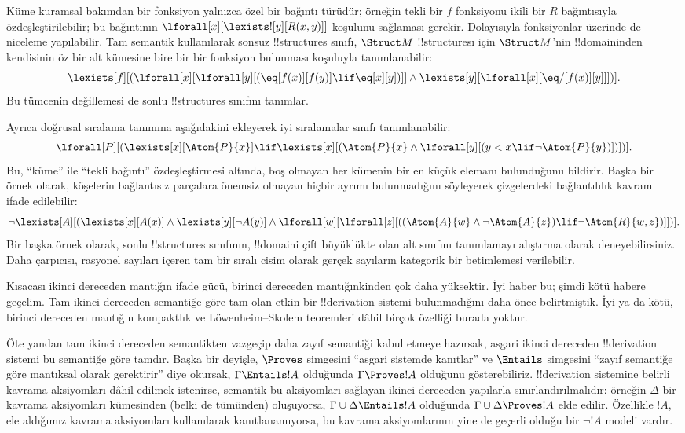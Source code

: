 \documentclass[../../../include/open-logic-section]{subfiles}
\begin{document}
Küme kuramsal bakımdan bir fonksiyon yalnızca özel bir bağıntı türüdür;
örneğin tekli bir $f$ fonksiyonu ikili bir $R$ bağıntısıyla
özdeşleştirilebilir; bu bağıntının $\lforall[x][\lexists![y][R(x,y)]]$
koşulunu sağlaması gerekir. Dolayısıyla fonksiyonlar
üzerinde de niceleme yapılabilir. Tam semantik kullanılarak sonsuz
!!{structure}s sınıfı, $\Struct M$ !!{structure}{}sı için $\Struct M$'nin
!!{domain}{}inden kendisinin öz bir alt kümesine bire bir bir fonksiyon bulunması
koşuluyla tanımlanabilir:
\[
\lexists[f][(\lforall[x][\lforall[y][(\eq[f(x)][f(y)] \lif \eq[x][y])]]
  \land \lexists[y][\lforall[x][\eq/[f(x)][y]]])].
\]
Bu tümcenin değillemesi de sonlu !!{structure}s sınıfını tanımlar.

Ayrıca doğrusal sıralama tanımına aşağıdakini ekleyerek iyi sıralamalar sınıfı
tanımlanabilir:
\[
\lforall[P][(\lexists[x][\Atom{P}{x}] \lif \lexists[x][(\Atom{P}{x}
    \land \lforall[y][(y < x \lif \lnot \Atom{P}{y})])])].
\]
Bu, ``küme'' ile ``tekli bağıntı'' özdeşleştirmesi altında, boş olmayan
her kümenin bir en küçük elemanı bulunduğunu bildirir. Başka bir örnek olarak,
köşelerin bağlantısız parçalara önemsiz olmayan hiçbir ayrımı bulunmadığını
söyleyerek çizgelerdeki bağlantılılık kavramı ifade edilebilir:
\[
\lnot \lexists[A][(\lexists[x][A(x)] \land \lexists[y][\lnot A(y)]
  \land \lforall[w][\lforall[z][((\Atom{A}{w} \land \lnot \Atom{A}{z})
      \lif \lnot \Atom{R}{w,z})]])].
\]
Bir başka örnek olarak, sonlu !!{structure}s sınıfının, !!{domain}{}i çift
büyüklükte olan alt sınıfını tanımlamayı alıştırma olarak deneyebilirsiniz.
Daha çarpıcısı,
rasyonel sayıları içeren tam bir sıralı cisim olarak gerçek sayıların kategorik
bir betimlemesi verilebilir.

Kısacası ikinci dereceden mantığın ifade gücü, birinci dereceden mantığınkinden
çok daha yüksektir. İyi haber bu; şimdi kötü habere geçelim. Tam ikinci dereceden semantiğe
göre tam olan etkin bir !!{derivation} sistemi bulunmadığını daha önce
belirtmiştik. İyi ya da kötü, birinci dereceden mantığın kompaktlık ve
L\"owenheim--Skolem teoremleri dâhil birçok özelliği burada yoktur.

Öte yandan tam ikinci dereceden semantikten vazgeçip daha zayıf semantiği
kabul etmeye hazırsak, asgari ikinci dereceden !!{derivation} sistemi bu semantiğe göre
tamdır. Başka bir deyişle, $\Proves$ simgesini ``asgari sistemde kanıtlar'' ve
$\Entails$ simgesini ``zayıf semantiğe göre mantıksal olarak gerektirir'' diye
okursak, $\Gamma \Entails !A$ olduğunda $\Gamma \Proves !A$ olduğunu
gösterebiliriz. !!{derivation} sistemine belirli kavrama aksiyomları dâhil
edilmek istenirse, semantik bu aksiyomları sağlayan ikinci dereceden yapılarla
sınırlandırılmalıdır: örneğin $\Delta$ bir kavrama aksiyomları kümesinden
(belki de tümünden) oluşuyorsa, $\Gamma \cup \Delta \Entails !A$ olduğunda
$\Gamma \cup \Delta \Proves !A$ elde edilir. Özellikle $!A$, ele aldığımız
kavrama aksiyomları kullanılarak kanıtlanamıyorsa, bu kavrama aksiyomlarının
yine de geçerli olduğu bir $\lnot !A$ modeli vardır.
\end{document}
